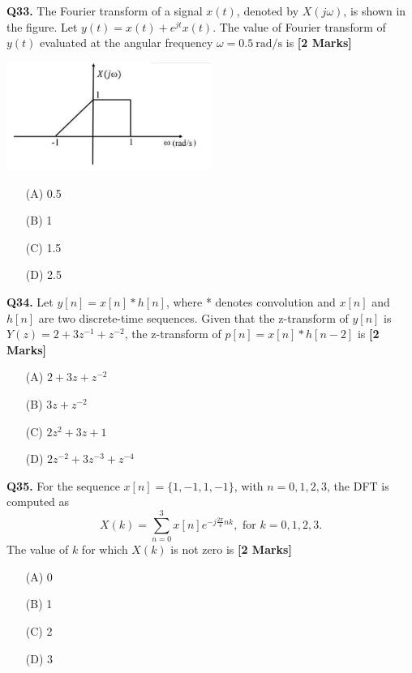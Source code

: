 \documentclass[11pt]{article}
\newcommand{\questionb}[2]{
    \noindent\textbf{Q#2.} #1 \hfill \textbf{[2 Marks]}
}
\begin{document}
\questionb{The Fourier transform of a signal \(x(t)\), denoted by \(X(j\omega)\), is shown in the figure.
Let \(y(t) = x(t) + e^{jt}x(t)\). The value of Fourier transform of \(y(t)\) evaluated at the angular frequency \(\omega = 0.5\ \text{rad/s}\) is}{33}
\begin{center}
\includegraphics[width=0.5\textwidth]{figures/33.png}
\end{center}
\begin{enumerate}
    \item[(A)] 0.5
    \item[(B)] 1
    \item[(C)] 1.5
    \item[(D)] 2.5
\end{enumerate}
\vspace{0.5cm}

\questionb{Let \(y[n] = x[n] * h[n]\), where * denotes convolution and \(x[n]\) and \(h[n]\) are two discrete-time sequences. Given that the z-transform of \(y[n]\) is \(Y(z) = 2 + 3z^{-1} + z^{-2}\), the z-transform of \(p[n] = x[n] * h[n - 2]\) is}{34}
\begin{enumerate}
    \item[(A)] \(2 + 3z + z^{-2}\)
    \item[(B)] \(3z + z^{-2}\)
    \item[(C)] \(2z^2 + 3z + 1\)
    \item[(D)] \(2z^{-2} + 3z^{-3} + z^{-4}\)
\end{enumerate}
\vspace{0.5cm}

\questionb{For the sequence \(x[n] = \{1, -1, 1, -1\}\), with \(n = 0,1,2,3\), the DFT is computed as
\[
X(k) = \sum_{n=0}^{3} x[n] e^{-j \frac{2\pi}{4}nk}, \text{ for } k = 0,1,2,3.
\]
The value of \(k\) for which \(X(k)\) is not zero is}{35}
\begin{enumerate}
    \item[(A)] 0
    \item[(B)] 1
    \item[(C)] 2
    \item[(D)] 3
\end{enumerate}
\vspace{0.5cm}
\end{document}
